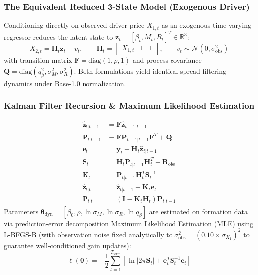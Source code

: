\documentclass[11pt, a4paper]{article}
\begin{document}
\subsubsection{The Equivalent Reduced 3-State Model (Exogenous Driver)}
Conditioning directly on observed driver price $X_{1,t}$ as an exogenous time-varying regressor reduces the latent state to $\mathbf{z}_t = [\beta_t, M_t, R_t]^T \in \mathbb{R}^3$:
\begin{equation}
    X_{2,t} = \mathbf{H}_t \mathbf{z}_t + v_t, \qquad \mathbf{H}_t = \begin{bmatrix} X_{1,t} & 1 & 1 \end{bmatrix}, \qquad v_t \sim \mathcal{N}(0, \sigma_{\text{obs}}^2)
\end{equation}
with transition matrix $\mathbf{F} = \text{diag}(1, \rho, 1)$ and process covariance $\mathbf{Q} = \text{diag}(q_\beta^2, \sigma_M^2, \sigma_R^2)$. Both formulations yield identical spread filtering dynamics under Base-1.0 normalization.

\subsubsection{Kalman Filter Recursion \& Maximum Likelihood Estimation}
\begin{align}
    \hat{\mathbf{z}}_{t|t-1} &= \mathbf{F} \hat{\mathbf{z}}_{t-1|t-1} \\
    \mathbf{P}_{t|t-1} &= \mathbf{F} \mathbf{P}_{t-1|t-1} \mathbf{F}^T + \mathbf{Q} \\
    \mathbf{e}_t &= \mathbf{y}_t - \mathbf{H}_t \hat{\mathbf{z}}_{t|t-1} \\
    \mathbf{S}_t &= \mathbf{H}_t \mathbf{P}_{t|t-1} \mathbf{H}_t^T + \mathbf{R}_{\text{obs}} \\
    \mathbf{K}_t &= \mathbf{P}_{t|t-1} \mathbf{H}_t^T \mathbf{S}_t^{-1} \\
    \hat{\mathbf{z}}_{t|t} &= \hat{\mathbf{z}}_{t|t-1} + \mathbf{K}_t \mathbf{e}_t \\
    \mathbf{P}_{t|t} &= (\mathbf{I} - \mathbf{K}_t \mathbf{H}_t) \mathbf{P}_{t|t-1}
\end{align}
Parameters $\bm{\theta}_{\text{dyn}} = [\beta_0, \rho, \ln\sigma_M, \ln\sigma_R, \ln q_\beta]$ are estimated on formation data via prediction-error decomposition Maximum Likelihood Estimation (MLE) using L-BFGS-B (with observation noise fixed analytically to $\sigma_{\text{obs}}^2 = (0.10 \times \sigma_{X_1})^2$ to guarantee well-conditioned gain updates):
\begin{equation}
    \ell(\bm{\theta}) = -\frac{1}{2} \sum_{t=1}^{T_{\text{form}}} \left[ \ln|2\pi \mathbf{S}_t| + \mathbf{e}_t^T \mathbf{S}_t^{-1} \mathbf{e}_t \right]
\end{equation}
\end{document}
